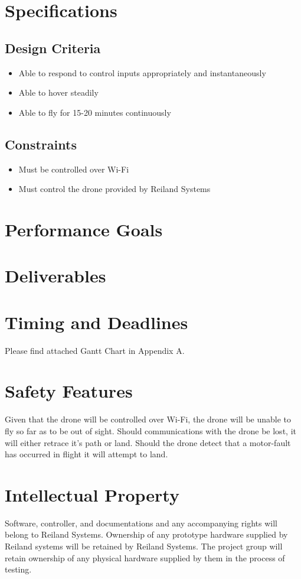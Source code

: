 \documentclass[draft]{article}
\begin{document}
\section{Specifications}
\subsection{Design Criteria}
\begin{itemize}
	\item Able to respond to control inputs appropriately and instantaneously 
	\item Able to hover steadily 
	\item Able to fly for 15-20 minutes continuously
\end{itemize}
\subsection{Constraints}
\begin{itemize}
	\item Must be controlled over Wi-Fi
	\item Must control the drone provided by Reiland Systems
\end{itemize}
\section{Performance Goals}

\section{Deliverables}

\section{Timing and Deadlines}
Please find attached Gantt Chart in Appendix A.
\section{Safety Features}
Given that the drone will be controlled over Wi-Fi, the drone will be unable to fly so far as to be out of sight.  Should communications with the drone be lost, it will either retrace it's path or land.  Should the drone detect that a motor-fault has occurred in flight it will attempt to land.
\section{Intellectual Property}
Software, controller, and documentations and any accompanying rights will belong to Reiland Systems.  Ownership of any prototype hardware supplied by Reiland systems will be retained by Reiland Systems.  The project group will retain ownership of any physical hardware supplied by them in the process of testing.

\end{document}
